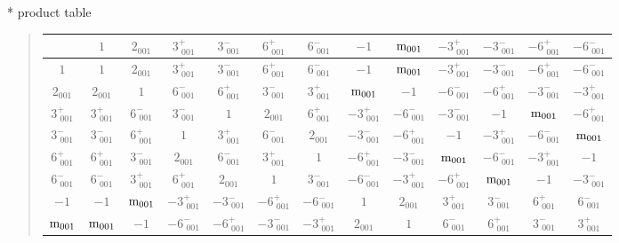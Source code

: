 \documentclass[fleqn,10pt,landscape]{jsarticle}
\begin{document}
* product table
\begin{quote}
\begin{tabular}{ccccccccccccc} \hline \hline
 & $ 1 $ & $ 2{}_{001} $ & $ 3^{+}_{\,\,001} $ & $ 3^{-}_{\,\,001} $ & $ 6^{+}_{\,\,001} $ & $ 6^{-}_{\,\,001} $ & $ -1 $ & $ {\rm m}_{001} $ & $ -3^{+}_{\,\,001} $ & $ -3^{-}_{\,\,001} $ & $ -6^{+}_{\,\,001} $ & $ -6^{-}_{\,\,001} $ \\ \hline
$ 1 $ & $ 1 $ & $ 2{}_{001} $ & $ 3^{+}_{\,\,001} $ & $ 3^{-}_{\,\,001} $ & $ 6^{+}_{\,\,001} $ & $ 6^{-}_{\,\,001} $ & $ -1 $ & $ {\rm m}_{001} $ & $ -3^{+}_{\,\,001} $ & $ -3^{-}_{\,\,001} $ & $ -6^{+}_{\,\,001} $ & $ -6^{-}_{\,\,001} $ \\
$ 2{}_{001} $ & $ 2{}_{001} $ & $ 1 $ & $ 6^{-}_{\,\,001} $ & $ 6^{+}_{\,\,001} $ & $ 3^{-}_{\,\,001} $ & $ 3^{+}_{\,\,001} $ & $ {\rm m}_{001} $ & $ -1 $ & $ -6^{-}_{\,\,001} $ & $ -6^{+}_{\,\,001} $ & $ -3^{-}_{\,\,001} $ & $ -3^{+}_{\,\,001} $ \\
$ 3^{+}_{\,\,001} $ & $ 3^{+}_{\,\,001} $ & $ 6^{-}_{\,\,001} $ & $ 3^{-}_{\,\,001} $ & $ 1 $ & $ 2{}_{001} $ & $ 6^{+}_{\,\,001} $ & $ -3^{+}_{\,\,001} $ & $ -6^{-}_{\,\,001} $ & $ -3^{-}_{\,\,001} $ & $ -1 $ & $ {\rm m}_{001} $ & $ -6^{+}_{\,\,001} $ \\
$ 3^{-}_{\,\,001} $ & $ 3^{-}_{\,\,001} $ & $ 6^{+}_{\,\,001} $ & $ 1 $ & $ 3^{+}_{\,\,001} $ & $ 6^{-}_{\,\,001} $ & $ 2{}_{001} $ & $ -3^{-}_{\,\,001} $ & $ -6^{+}_{\,\,001} $ & $ -1 $ & $ -3^{+}_{\,\,001} $ & $ -6^{-}_{\,\,001} $ & $ {\rm m}_{001} $ \\
$ 6^{+}_{\,\,001} $ & $ 6^{+}_{\,\,001} $ & $ 3^{-}_{\,\,001} $ & $ 2{}_{001} $ & $ 6^{-}_{\,\,001} $ & $ 3^{+}_{\,\,001} $ & $ 1 $ & $ -6^{+}_{\,\,001} $ & $ -3^{-}_{\,\,001} $ & $ {\rm m}_{001} $ & $ -6^{-}_{\,\,001} $ & $ -3^{+}_{\,\,001} $ & $ -1 $ \\
$ 6^{-}_{\,\,001} $ & $ 6^{-}_{\,\,001} $ & $ 3^{+}_{\,\,001} $ & $ 6^{+}_{\,\,001} $ & $ 2{}_{001} $ & $ 1 $ & $ 3^{-}_{\,\,001} $ & $ -6^{-}_{\,\,001} $ & $ -3^{+}_{\,\,001} $ & $ -6^{+}_{\,\,001} $ & $ {\rm m}_{001} $ & $ -1 $ & $ -3^{-}_{\,\,001} $ \\
$ -1 $ & $ -1 $ & $ {\rm m}_{001} $ & $ -3^{+}_{\,\,001} $ & $ -3^{-}_{\,\,001} $ & $ -6^{+}_{\,\,001} $ & $ -6^{-}_{\,\,001} $ & $ 1 $ & $ 2{}_{001} $ & $ 3^{+}_{\,\,001} $ & $ 3^{-}_{\,\,001} $ & $ 6^{+}_{\,\,001} $ & $ 6^{-}_{\,\,001} $ \\
$ {\rm m}_{001} $ & $ {\rm m}_{001} $ & $ -1 $ & $ -6^{-}_{\,\,001} $ & $ -6^{+}_{\,\,001} $ & $ -3^{-}_{\,\,001} $ & $ -3^{+}_{\,\,001} $ & $ 2{}_{001} $ & $ 1 $ & $ 6^{-}_{\,\,001} $ & $ 6^{+}_{\,\,001} $ & $ 3^{-}_{\,\,001} $ & $ 3^{+}_{\,\,001} $ \\

\end{tabular}
\end{quote}
\end{document}
